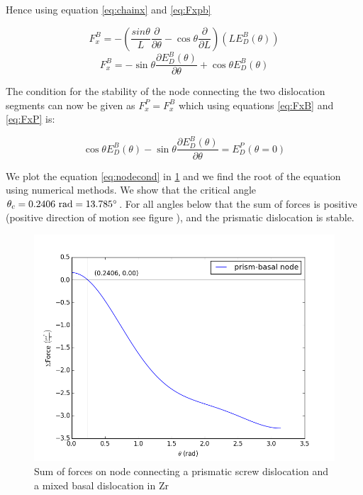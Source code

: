 \documentclass[10pt,a4paper,final]{article}
\begin{document}
Hence using equation \ref{eq:chainx} and \ref{eq:Fxpb}

\begin{equation*}
F_x^B = -\left(\frac{sin\theta}{L}\frac{\partial}{\partial\theta} - \cos\theta\frac{\partial}{\partial L}\right)\left(LE_D^B(\theta)\right)
\end{equation*}
\begin{equation}
F_x^B = -\sin\theta\frac{\partial E_D^B(\theta)}{\partial\theta} + \cos\theta E_D^B(\theta) \label{eq:FxB}
\end{equation}

The condition for the stability of the node connecting the two dislocation segments can now be given as $F_x^P = F_x^B$ which using equations \ref{eq:FxB} and \ref{eq:FxP} is:

\begin{equation}
\boxed{ \cos\theta E_D^B(\theta) - \sin\theta\frac{\partial E_D^B(\theta)}{\partial\theta} = E_D^P(\theta=0) } \label{eq:nodecond}
\end{equation}

We plot the equation \ref{eq:nodecond} in \ref{fig:nodestab} and we find the root of the equation using numerical methods. We show that the critical angle $\theta_c = 0.2406~\text{rad} = 13.785 \degree$. For all angles below that the sum of forces is positive (positive direction of motion see figure \label{fig:fig:crossslip}), and the prismatic dislocation is stable.

\begin{figure}
\centering
\includegraphics[scale=0.6]{png/force_node.png}
\caption{Sum of forces on node connecting a prismatic screw dislocation and a mixed basal dislocation in Zr}
\label{fig:nodestab}
\end{figure}
\pagebreak
\end{document}
